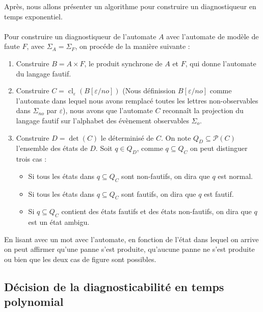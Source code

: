 \documentclass[10pt,a4paper]{article}
\begin{document}
    Apr\`es, nous allons présenter un algorithme pour construire un diagnostiqueur en temps exponentiel. ~\cite{SamSRST96}

    \paragraph{}
    Pour construire un diagnostiqueur de l'automate $A$ avec l'automate de mod\`ele de faute $F$, avec $\Sigma_A = \Sigma_F$, on proc\'ede de la mani\`ere suivante :
    
\begin{enumerate}
  \item Construire $B=A\times F$, le produit synchrone de $A$ et $F$, qui donne l'automate du langage fautif.
  \item Construire $C=\operatorname{cl}_\varepsilon(B[\varepsilon/no])$ (Nous d\'efinission $B[\varepsilon/no]$ comme l'automate dans lequel nous avons remplac\'e toutes les lettres non-observables dans $\Sigma_{no}$ par $\varepsilon$), nous avons que l'automate $C$ reconna\^it la projection du langage fautif sur l'alphabet des \'ev\`enement observables $\Sigma_o$.
  \item Construire $D=\det(C)$ le d\'eterminis\'e de $C$. On note $Q_D \subseteq \mathcal{P}(C)$ l'ensemble des états de $D$. Soit $q \in Q_D$, comme $q \subseteq Q_C$ on peut distinguer trois cas :
  \begin{itemize}
    \item Si tous les \'etats dans $q\subseteq Q_C$ sont non-fautifs, on dira que $q$ est normal.
    \item Si tous les \'etats dans $q\subseteq Q_C$ sont fautifs, on dira que $q$ est fautif.
    \item Si $q\subseteq Q_C$ contient des \'etats fautifs et des \'etats non-fautifs, on dira que $q$ est un \'etat ambigu.
  \end{itemize}
\end{enumerate} 

En lisant avec un mot avec l'automate, en fonction de l'état dans lequel on arrive on peut affirmer qu'une panne s'est produite, qu'aucune panne ne s'est produite ou bien que les deux cas de figure sont possibles.

\subsection{D\'ecision de la diagnosticabilit\'e en temps polynomial}
\end{document}
